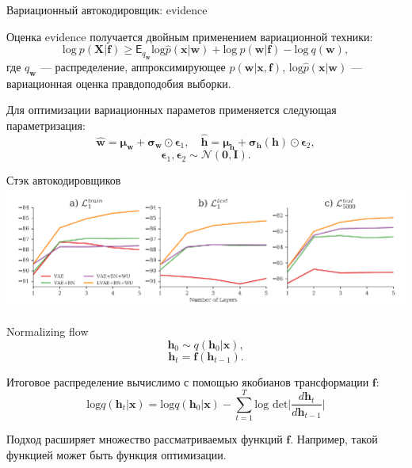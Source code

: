\documentclass[10pt,pdf,utf8,russian,aspectratio=169]{beamer}
\begin{document}
\begin{frame}{Вариационный автокодировщик: evidence}

Оценка evidence получается двойным применением вариационной техники:
$$
\text{log}~p(\mathbf{X}|\mathbf{f}) \geq \mathsf{E}_{q_\mathbf{w}} \text{log}\hat{p}(\mathbf{x}|\mathbf{w}) + \text{log}~p(\mathbf{w}|\mathbf{f}) - \text{log}~q(\mathbf{w}),
$$
где $q_\mathbf{w}$ --- распределение, аппроксимирующее $p(\mathbf{w}|\mathbf{x}, \mathbf{f})$, $ \text{log}\hat{p}(\mathbf{x}|\mathbf{w})$ --- вариационная оценка правдоподобия выборки.

Для оптимизации вариационных параметов применяется следующая параметризация:
$$
\hat{\mathbf{w}} = \boldsymbol{\mu}_\mathbf{w} + \boldsymbol{\sigma}_{\mathbf{w}}\odot \boldsymbol{\epsilon}_1,\quad \hat{\mathbf{h}} = \boldsymbol{\mu}_\mathbf{h} + \boldsymbol{\sigma}_\mathbf{h}(\mathbf{h})\odot \boldsymbol{\epsilon}_2, 
$$
$$
\boldsymbol{\epsilon}_1, \boldsymbol{\epsilon}_2 \sim \mathcal{N}(\mathbf{0}, \mathbf{I}).
$$

\end{frame}


\begin{frame}{Стэк автокодировщиков}
\includegraphics[width=\textwidth]{stack.png}

\end{frame}


\begin{frame}{Normalizing flow}
$$\mathbf{h}_0 \sim q(\mathbf{h}_0|\mathbf{x}),$$
$$\mathbf{h}_t = \mathbf{f}(\mathbf{h}_{t-1}).$$

Итоговое распределение вычислимо с помощью якобианов трансформации $\mathbf{f}$:
$$\text{log}q(\mathbf{h}_t|\mathbf{x}) = \text{log} q(\mathbf{h}_0|\mathbf{x}) - \sum_{t=1}^T \text{log det} \bigl|\frac{d\mathbf{h}_t}{d\mathbf{h}_{t-1}}\bigr|$$

Подход расширяет множество рассматриваемых функций $\mathbf{f}$. Например, такой функцией может быть функция оптимизации.

\end{frame}
\end{document}
